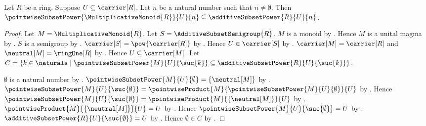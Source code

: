 \begin{theorem}\label{pointwise_subset_power_subseteq_additive_subset_power}
    Let $R$ be a ring. Suppose $U\subseteq\carrier[R]$.
    Let $n$ be a natural number such that $n\neq\emptyset$.
    Then
        $\pointwiseSubsetPower{\MultiplicativeMonoid{R}}{U}{n}
            \subseteq\additiveSubsetPower{R}{U}{n}$.
\end{theorem}
\begin{proof}
    Let $M=\MultiplicativeMonoid{R}$.
    Let $S=\AdditiveSubsetSemigroup{R}$.
    $M$ is a monoid by .
    Hence $M$ is a unital magma by .
    $S$ is a semigroup by .
    $\carrier[S]=\pow{\carrier[R]}$ by
        .
    Hence $U\in\carrier[S]$ by .
    $\carrier[M]=\carrier[R]$ and $\neutral[M]=\ringOne[R]$ by
        .
    Hence $U\subseteq\carrier[M]$.
    Let $C=\{k\in\naturals\mid
        \pointwiseSubsetPower{M}{U}{\suc{k}}
            \subseteq\additiveSubsetPower{R}{U}{\suc{k}}\}$.

    $\emptyset$ is a natural number by .
    $\pointwiseSubsetPower{M}{U}{\emptyset}=\{\neutral[M]\}$ by
        .
    $\pointwiseSubsetPower{M}{U}{\suc{\emptyset}}
        =\pointwiseProduct{M}{
            \pointwiseSubsetPower{M}{U}{\emptyset}}{U}$ by
        .
    Hence $\pointwiseSubsetPower{M}{U}{\suc{\emptyset}}
        =\pointwiseProduct{M}{\{\neutral[M]\}}{U}$ by \auto.
    $\pointwiseProduct{M}{\{\neutral[M]\}}{U}=U$ by
        .
    Hence $\pointwiseSubsetPower{M}{U}{\suc{\emptyset}}=U$ by
        \auto.
    $\additiveSubsetPower{R}{U}{\suc{\emptyset}}=U$ by
        .
    Hence $\emptyset\in C$ by .


\end{proof}
